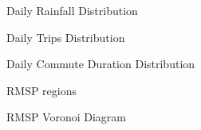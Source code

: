
\begin{figure}[H]
    \centering
    
    \caption{Daily Rainfall Distribution}
    \label{fig:rainfall_hist}
\end{figure}

\begin{figure}[H]
    \centering
    
    \caption{Daily Trips Distribution}
    \label{fig:trips_hist}
\end{figure}

\begin{figure}[H]
    \centering
    
    \caption{Daily Commute Duration Distribution}
    \label{fig:duration_hist}
\end{figure}

\begin{figure}[H]
    \centering
    
    \caption{RMSP regions}
    \label{fig:rmsp_base}
\end{figure}

\begin{figure}[H]
    \centering
    
    \caption{RMSP Voronoi Diagram}
    \label{fig:rmsp_voronoi}
\end{figure}








\cite{branco2021AmericanJAgriEconomics}